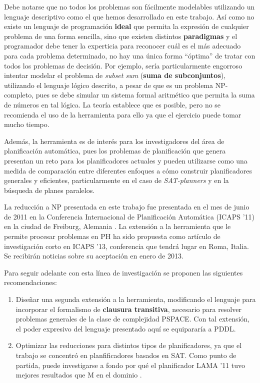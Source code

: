 Debe notarse que no todos los problemas son fácilmente modelables utilizando un
lenguaje descriptivo como el que hemos desarrollado en este trabajo. Así como
no existe un lenguaje de programación \textbf{ideal} que permita la expresión
de cualquier problema de una forma sencilla, sino que existen distintos
\textbf{paradigmas} y el programador debe tener la experticia para reconocer
cuál es el más adecuado para cada problema determinado, no hay una única forma
``óptima'' de tratar con todos los problemas de decisión.
Por ejemplo, sería particularmente engorroso intentar
modelar el problema de \textit{subset sum} (\textbf{suma de subconjuntos}),
utilizando el lenguaje lógico descrito, a pesar de que es un problema
NP-completo, pues se debe simular un sistema formal
aritmético que permita la suma de números en tal lógica. La teoría establece
que es posible, pero no se recomienda el uso de la herramienta para ello ya que
el ejercicio puede tomar mucho tiempo.

Además, la herramienta es de interés para los investigadores del área de
planificación automática, pues los problemas de planificación que genera
presentan un reto para los planificadores actuales y pueden utilizarse como una
medida de comparación entre diferentes enfoques a cómo construir planificadores
generales y eficientes, particularmente en el caso de \textit{SAT-planners} y
en la búsqueda de planes paralelos.

La reducción a NP presentada en este trabajo fue presentada en el mes de junio
de 2011 en la Conferencia Internacional de
Planificación Automática (ICAPS '11) en la ciudad de Freiburg, Alemania
\citep{porco:npreductions}.
La extensión a la herramienta que le permite procesar problemas en PH ha sido
propuesta como artículo de investigación corto en ICAPS '13, conferencia que
tendrá lugar en Roma, Italia. Se recibirán noticias sobre su aceptación en
enero de 2013.

Para seguir adelante con esta línea de investigación se proponen las siguientes
recomendaciones:

\begin{enumerate}[--]
\item Diseñar una segunda extensión a la herramienta, modificando el lenguaje
para incorporar el formalismo de \textbf{clausura transitiva}, necesario para
resolver problemas generales de la clase de complejidad PSPACE. Con tal
extensión, el poder expresivo del lenguaje presentado aquí se equipararía a
PDDL.
\item Optimizar las reducciones para distintos tipos de planificadores, ya que
el trabajo se concentró en planfificadores basados en SAT. Como punto de
partida, puede investigarse a fondo por qué el planificador LAMA '11 tuvo
mejores resultados que M en el dominio \coCOL.
\end{enumerate}
